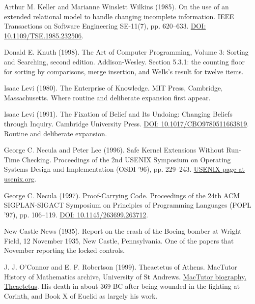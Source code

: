 \documentclass[11pt,twoside]{article}
\theoremstyle{thielethm}
\theoremstyle{thieledef}
\theoremstyle{thieledef}
\theoremstyle{thieledef}
\theoremstyle{thielethm}
\theoremstyle{thieleobs}
\theoremstyle{thielethm}
\begin{document}
\noindent Arthur M. Keller and Marianne Winslett Wilkins (1985). On the use of an extended relational model to handle changing incomplete information. IEEE Transactions on Software Engineering SE-11(7), pp. 620--633. \href{https://doi.org/10.1109/TSE.1985.232506}{DOI: 10.1109/TSE.1985.232506}.
\par\medskip

\noindent Donald E. Knuth (1998). The Art of Computer Programming, Volume 3: Sorting and Searching, second edition. Addison-Wesley. Section 5.3.1: the counting floor for sorting by comparisons, merge insertion, and Wells's result for twelve items.
\par\medskip

\noindent Isaac Levi (1980). The Enterprise of Knowledge. MIT Press, Cambridge, Massachusetts. Where routine and deliberate expansion first appear.
\par\medskip

\noindent Isaac Levi (1991). The Fixation of Belief and Its Undoing: Changing Beliefs through Inquiry. Cambridge University Press. \href{https://doi.org/10.1017/CBO9780511663819}{DOI: 10.1017/CBO9780511663819}. Routine and deliberate expansion.
\par\medskip

\noindent George C. Necula and Peter Lee (1996). Safe Kernel Extensions Without Run-Time Checking. Proceedings of the 2nd USENIX Symposium on Operating Systems Design and Implementation (OSDI '96), pp. 229--243. \href{https://www.usenix.org/conference/osdi-96/safe-kernel-extensions-without-run-time-checking}{USENIX page at usenix.org}.
\par\medskip

\noindent George C. Necula (1997). Proof-Carrying Code. Proceedings of the 24th ACM SIGPLAN-SIGACT Symposium on Principles of Programming Languages (POPL '97), pp. 106--119. \href{https://doi.org/10.1145/263699.263712}{DOI: 10.1145/263699.263712}.
\par\medskip

\noindent New Castle News (1935). Report on the crash of the Boeing bomber at Wright Field, 12 November 1935, New Castle, Pennsylvania. One of the papers that November reporting the locked controls.
\par\medskip

\noindent J. J. O'Connor and E. F. Robertson (1999). Theaetetus of Athens. MacTutor History of Mathematics archive, University of St Andrews. \href{https://mathshistory.st-andrews.ac.uk/Biographies/Theaetetus/}{MacTutor biography, Theaetetus}. His death in about 369 BC after being wounded in the fighting at Corinth, and Book X of Euclid as largely his work.
\par\medskip
\end{document}
